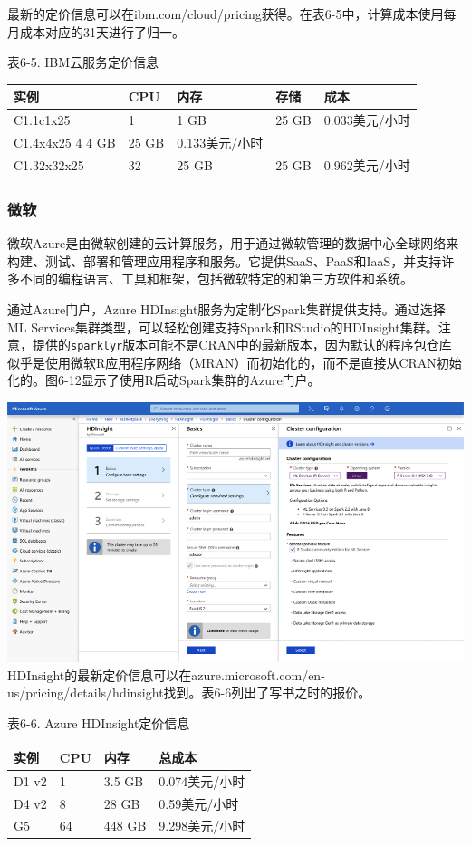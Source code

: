 \documentclass[
]{article}
\begin{document}
最新的定价信息可以在ibm.com/cloud/pricing获得。在表6-5中，计算成本使用每月成本对应的31天进行了归一。

表6-5. IBM云服务定价信息

\begin{longtable}[]{@{}lllll@{}}
\toprule
实例 & CPU & 内存 & 存储 & 成本\tabularnewline
\midrule
\endhead
C1.1c1x25 & 1 & 1 GB & 25 GB & 0.033美元/小时\tabularnewline
C1.4x4x25 4 4 GB & 25 GB & 0.133美元/小时 & &\tabularnewline
C1.32x32x25 & 32 & 25 GB & 25 GB & 0.962美元/小时\tabularnewline
\bottomrule
\end{longtable}

\hypertarget{ux5faeux8f6f}{%
\subsubsection{微软}\label{ux5faeux8f6f}}

微软Azure是由微软创建的云计算服务，用于通过微软管理的数据中心全球网络来构建、测试、部署和管理应用程序和服务。它提供SaaS、PaaS和IaaS，并支持许多不同的编程语言、工具和框架，包括微软特定的和第三方软件和系统。

通过Azure门户，Azure HDInsight服务为定制化Spark集群提供支持。通过选择ML
Services集群类型，可以轻松创建支持Spark和RStudio的HDInsight集群。注意，提供的\texttt{sparklyr}版本可能不是CRAN中的最新版本，因为默认的程序包仓库似乎是使用微软R应用程序网络（MRAN）而初始化的，而不是直接从CRAN初始化的。图6-12显示了使用R启动Spark集群的Azure门户。

\includegraphics{figures/6_12.png}
HDInsight的最新定价信息可以在azure.microsoft.com/en-us/pricing/details/hdinsight找到。表6-6列出了写书之时的报价。

表6-6. Azure HDInsight定价信息

\begin{longtable}[]{@{}llll@{}}
\toprule
实例 & CPU & 内存 & 总成本\tabularnewline
\midrule
\endhead
D1 v2 & 1 & 3.5 GB & 0.074美元/小时\tabularnewline
D4 v2 & 8 & 28 GB & 0.59美元/小时\tabularnewline
G5 & 64 & 448 GB & 9.298美元/小时\tabularnewline
\bottomrule
\end{longtable}
\end{document}
